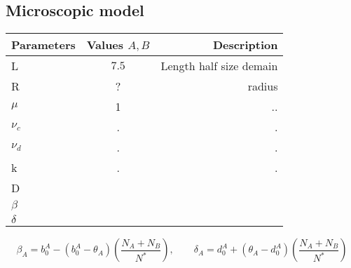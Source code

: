 \subsection{Microscopic model}



	\begin{center}
	\begin{tabular}{ l | c | r }
		\hline
		Parameters & Values $A, B$ & Description \\ \hline
		L & $7.5$ & Length half size demain  \\ 
		R & ? &  radius \\
	
		$\mu$ & 1  & ..\\
		$\nu_c$  & .&  . \\
		$\nu_d$  & .&  . \\
		k & . & .\\
		D & & \\
		$\beta$ & & \\
		$\delta$ & & \\

		\hline
	\end{tabular}
\end{center}	

\begin{equation}
\beta_{A}=b_{0}^{A}-(b_{0}^{A}-\theta_{A})\left(\frac{N_A+N_B}{N^{*}}\right), \quad\quad \delta_{A}=d_{0}^{A}+(\theta_{A}-d_{0}^{A})\left(\frac{N_A+N_B}{N^{*}}\right)
\end{equation}

